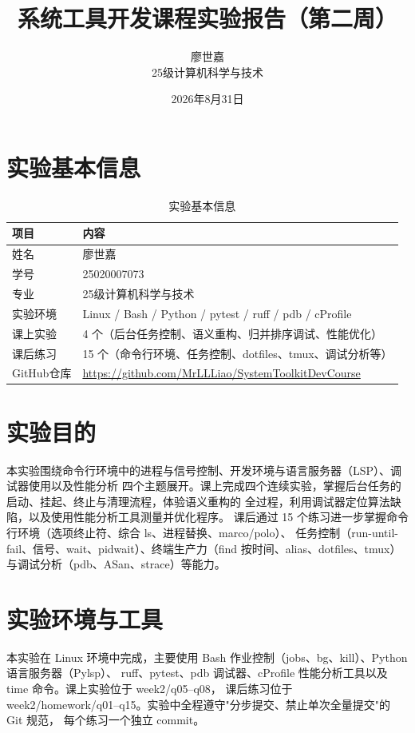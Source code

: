 \documentclass[UTF8]{ctexart}
\title{\textbf{系统工具开发课程实验报告（第二周）}}
\author{廖世嘉 \quad 25020007073 \\ 25级计算机科学与技术}
\date{2026年8月31日}
\begin{document}
\maketitle
\tableofcontents
\newpage

\section{实验基本信息}

\begin{table}[H]
\centering
\caption{实验基本信息}
\label{tab:info}
\begin{tabular}{ll}
\toprule
项目 & 内容 \\
\midrule
姓名 & 廖世嘉 \\
学号 & 25020007073 \\
专业 & 25级计算机科学与技术 \\
实验环境 & Linux / Bash / Python / pytest / ruff / pdb / cProfile \\
课上实验 & 4 个（后台任务控制、语义重构、归并排序调试、性能优化）\\
课后练习 & 15 个（命令行环境、任务控制、dotfiles、tmux、调试分析等）\\
GitHub仓库 & \href{https://github.com/MrLLLiao/SystemToolkitDevCourse}{https://github.com/MrLLLiao/SystemToolkitDevCourse} \\
\bottomrule
\end{tabular}
\end{table}

\section{实验目的}

本实验围绕命令行环境中的进程与信号控制、开发环境与语言服务器（LSP）、调试器使用以及性能分析
四个主题展开。课上完成四个连续实验，掌握后台任务的启动、挂起、终止与清理流程，体验语义重构的
全过程，利用调试器定位算法缺陷，以及使用性能分析工具测量并优化程序。
课后通过 15 个练习进一步掌握命令行环境（选项终止符、综合 ls、进程替换、marco/polo）、
任务控制（run-until-fail、信号、wait、pidwait）、终端生产力（find 按时间、alias、dotfiles、tmux）
与调试分析（pdb、ASan、strace）等能力。

\section{实验环境与工具}

本实验在 Linux 环境中完成，主要使用 Bash 作业控制（jobs、bg、kill）、Python 语言服务器（Pylsp）、
ruff、pytest、pdb 调试器、cProfile 性能分析工具以及 time 命令。课上实验位于 week2/q05--q08，
课后练习位于 week2/homework/q01--q15。实验中全程遵守"分步提交、禁止单次全量提交"的 Git 规范，
每个练习一个独立 commit。
\end{document}

